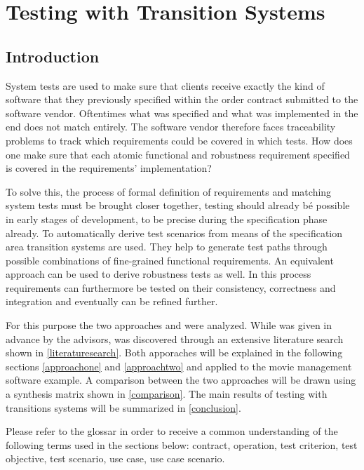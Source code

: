 \chapter{Testing with Transition Systems}


\section{Introduction}

System tests are used to make sure that clients receive exactly the kind of software that they previously specified within the order contract submitted to the software vendor. Oftentimes what was specified and what was implemented in the end does not match entirely. The software vendor therefore faces traceability problems to track which requirements could be covered in which tests. How does one make sure that each atomic functional and robustness requirement specified is covered in the requirements' implementation?

To solve this, the process of formal definition of requirements and matching system tests must be brought closer together, testing should already bé possible in early stages of development, to be precise during the specification phase already. To automatically derive test scenarios from means of the specification area transition systems are used. They help to generate test paths through possible combinations of fine-grained functional requirements. An equivalent approach can be used to derive robustness tests as well. In this process requirements can furthermore be tested on their consistency, correctness and integration and eventually can be refined further.

For this purpose the two approaches \cite{ClementineNebut2006} and \cite{NajlaRaza2007} were analyzed. While \cite{ClementineNebut2006} was given in advance by the advisors, \cite{NajlaRaza2007} was discovered through an extensive literature search shown in \autoref{literaturesearch}. Both apporaches will be explained in the following sections \ref{approachone} and \ref{approachtwo} and applied to the movie management software example. A comparison between the two approaches will be drawn using a synthesis matrix shown in \autoref{comparison}. The main results of testing with transitions systems will be summarized in \autoref{conclusion}. 

Please refer to the glossar in order to receive a common understanding of the following terms used in the sections below: contract, operation, test criterion, test objective, test scenario, use case, use case scenario.

